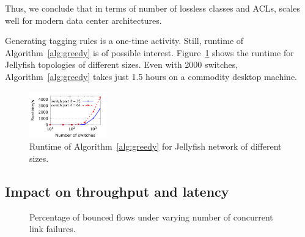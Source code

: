 Thus, we conclude that in terms of number of lossless classes and ACLs,
\sysname{} scales well for modern data center architectures.

Generating tagging rules is a one-time activity. Still, runtime of
Algorithm~\ref{alg:greedy} is of possible interest.
Figure~\ref{fig:algo_runtime} shows the runtime for Jellyfish topologies of
different sizes. Even with 2000 switches, Algorithm~\ref{alg:greedy} takes
just 1.5 hours on a commodity desktop machine.


\begin{figure}
	\centering
	\includegraphics[width=0.3\textwidth] {figs/algo_runtime}
	\vspace{-1em}
	\caption{Runtime of Algorithm~\ref{alg:greedy} for Jellyfish network of different sizes.}
	\label{fig:algo_runtime}
	\vspace{-0.25in}
\end{figure}

\subsection{Impact on throughput and latency}\label{subsec:exp_performanceoverhead}

\begin{figure}[t]
	\centering
	
	\vspace{-1em}
	\caption{Percentage of bounced flows under varying number of concurrent link failures.}
	\vspace{-1em}
	\label{fig:bounce_probability}
\end{figure}

